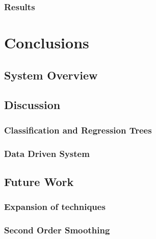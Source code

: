 \documentclass[bsc,frontabs,twoside,singlespacing,parskip]{infthesis}
\begin{document}
\subsection{Results}
\chapter{Conclusions}

\section{System Overview}

\section{Discussion}

\subsection{Classification and Regression Trees}

\subsection{Data Driven System}

\section{Future Work}

\subsection{Expansion of techniques}

\subsection{Second Order Smoothing}
	


\end{document}
